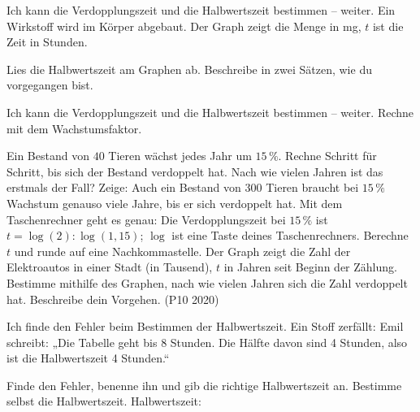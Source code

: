 \begin{aufgabe}{Ich kann die Verdopplungszeit und die Halbwertszeit bestimmen – weiter. Ein Wirkstoff wird im Körper abgebaut. Der Graph zeigt die Menge in mg, $t$ ist die Zeit in Stunden.}

\begin{ksys}[xmin=0,xmax=10,ymin=0,ymax=360,ystep=40,ablesen,xlabel=$t$ in h,ylabel=mg]
\end{ksys}

\begin{teile}
\teil Lies die Halbwertszeit am Graphen ab. \quad \leerfeld[h]
\teil Beschreibe in zwei Sätzen, wie du vorgegangen bist.
\end{teile}
\end{aufgabe}

\begin{aufgabe}{Ich kann die Verdopplungszeit und die Halbwertszeit bestimmen – weiter. Rechne mit dem Wachstumsfaktor.}
\begin{teile}
\teil Ein Bestand von $40$ Tieren wächst jedes Jahr um $15\,\%$. Rechne Schritt für Schritt, bis sich der Bestand verdoppelt hat. Nach wie vielen Jahren ist das erstmals der Fall? \quad \leerfeld[Jahre]
\teil Zeige: Auch ein Bestand von $300$ Tieren braucht bei $15\,\%$ Wachstum genauso viele Jahre, bis er sich verdoppelt hat.
\teil Mit dem Taschenrechner geht es genau: Die Verdopplungszeit bei $15\,\%$ ist $t = \log(2) : \log(1{,}15)$; $\log$ ist eine Taste deines Taschenrechners. Berechne $t$ und runde auf eine Nachkommastelle. \quad \leerfeld[Jahre]
\teil Der Graph zeigt die Zahl der Elektroautos in einer Stadt (in Tausend), $t$ in Jahren seit Beginn der Zählung. Bestimme mithilfe des Graphen, nach wie vielen Jahren sich die Zahl verdoppelt hat. Beschreibe dein Vorgehen. (P10 2020)
\end{teile}

\begin{ksys}[xmin=0,xmax=12,ymin=0,ymax=4.8,ystep=0.4,ablesen,xlabel=$t$ in Jahren,ylabel=Tausend]
\end{ksys}

\end{aufgabe}

\begin{aufgabe}{Ich finde den Fehler beim Bestimmen der Halbwertszeit. Ein Stoff zerfällt:}
Emil schreibt: „Die Tabelle geht bis 8 Stunden. Die Hälfte davon sind 4 Stunden, also ist die Halbwertszeit 4 Stunden.“
\begin{teile}
\teil Finde den Fehler, benenne ihn und gib die richtige Halbwertszeit an.
\teil Bestimme selbst die Halbwertszeit. \hfill Halbwertszeit: \leerfeld[Jahre]
\end{teile}
\end{aufgabe}

